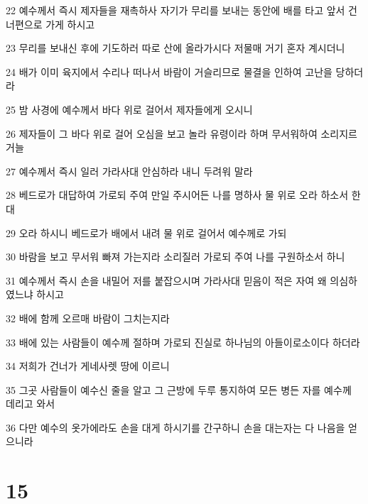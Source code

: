 \par 22 예수께서 즉시 제자들을 재촉하사 자기가 무리를 보내는 동안에 배를 타고 앞서 건너편으로 가게 하시고
\par 23 무리를 보내신 후에 기도하러 따로 산에 올라가시다 저물매 거기 혼자 계시더니
\par 24 배가 이미 육지에서 수리나 떠나서 바람이 거슬리므로 물결을 인하여 고난을 당하더라
\par 25 밤 사경에 예수께서 바다 위로 걸어서 제자들에게 오시니
\par 26 제자들이 그 바다 위로 걸어 오심을 보고 놀라 유령이라 하며 무서워하여 소리지르거늘
\par 27 예수께서 즉시 일러 가라사대 안심하라 내니 두려워 말라
\par 28 베드로가 대답하여 가로되 주여 만일 주시어든 나를 명하사 물 위로 오라 하소서 한대
\par 29 오라 하시니 베드로가 배에서 내려 물 위로 걸어서 예수께로 가되
\par 30 바람을 보고 무서워 빠져 가는지라 소리질러 가로되 주여 나를 구원하소서 하니
\par 31 예수께서 즉시 손을 내밀어 저를 붙잡으시며 가라사대 믿음이 적은 자여 왜 의심하였느냐 하시고
\par 32 배에 함께 오르매 바람이 그치는지라
\par 33 배에 있는 사람들이 예수께 절하며 가로되 진실로 하나님의 아들이로소이다 하더라
\par 34 저희가 건너가 게네사렛 땅에 이르니
\par 35 그곳 사람들이 예수신 줄을 알고 그 근방에 두루 통지하여 모든 병든 자를 예수께 데리고 와서
\par 36 다만 예수의 옷가에라도 손을 대게 하시기를 간구하니 손을 대는자는 다 나음을 얻으니라

\chapter{15}

